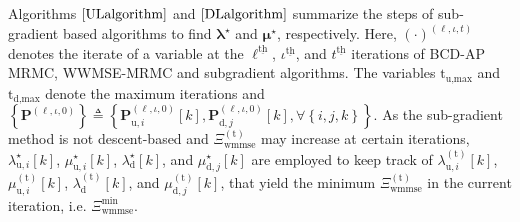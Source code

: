 \documentclass[9pt,journal]{IEEEtran}
\newcommand{\paren}[1]{\left({#1}\right)}
\newcommand{\bracket}[1]{{\left [{#1}\right ]}}
\newcommand{\braces}[1]{{\left\{ {#1}\right\}}}
\newcommand{\ith}[1]    {{#1}^{\underline{\text{th}}}}
\theoremstyle{definition}
\begin{document}
Algorithms $\ref{ULalgorithm}$ and $\ref{DLalgorithm}$ summarize the steps of sub-gradient based algorithms to find $\boldsymbol{\lambda}^\star$ and $\boldsymbol{\mu}^\star$, respectively. Here, $(\cdot)^{\paren{\ell,\iota,t}}$ denotes the iterate of a variable at the $\ith{\ell}$, $\ith{\iota}$, and $\ith{t}$  iterations of BCD-AP MRMC, WWMSE-MRMC and subgradient algorithms. The variables $\mathrm{t}_{\textrm{u,max}}$ and $\mathrm{t}_{\textrm{d,max}}$ denote the maximum iterations and $\braces{\mathbf{P}^{\paren{\ell,\iota,0}}}\triangleq\braces{\mathbf{P}^{\paren{\ell,\iota,0}}_{\textrm{u},i}\bracket{k},\mathbf{P}^{\paren{\ell,\iota,0}}_{\textrm{d},j}\bracket{k},\forall \braces{i,j,k}}$. As the sub-gradient method is not descent-based and $\Xi^{\paren{\mathrm{t}}}_{\textrm{wmmse}}$ may increase at certain iterations\cite{Lui2006subg}, $\lambda^{\star}_{\textrm{u},i}\bracket{k}$, $\mu^\star_{\textrm{u},i}\bracket{k}$, $\lambda^{\star}_{\textrm{d}}\bracket{k}$, and $\mu^\star_{\textrm{d},j}\bracket{k}$ are employed to keep track of $\lambda^{\paren{\mathrm{t}}}_{\textrm{u},i}\bracket{k}$, $\mu^{\paren{\mathrm{t}}}_{\textrm{u},i}\bracket{k}$, $\lambda^{\paren{\mathrm{t}}}_{\textrm{d}}\bracket{k}$, and $\mu^{\paren{\mathrm{t}}}_{\textrm{d},j}\bracket{k}$,  that yield the minimum $\Xi^{\paren{\mathrm{t}}}_{\textrm{wmmse}}$ in the current iteration, i.e.  $\Xi^{\textrm{min}}_{\textrm{wmmse}}$.  
\end{document}
